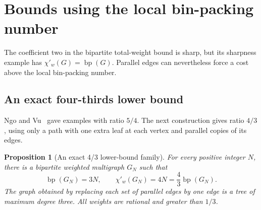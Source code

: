 \documentclass[11pt]{article}
\newtheorem{proposition}[theorem]{Proposition}
\theoremstyle{definition}\newtheorem{algorithm}{Algorithm}[section]
\numberwithin{equation}{section}
\theoremstyle{remark}\newtheorem*{remark}{Remark}
\newcommand{\bp}{\operatorname{bp}}
\begin{document}
\section{Bounds using the local bin-packing number}\label{sec:bp-bounds}
The coefficient two in the bipartite total-weight bound is sharp, but
its sharpness example has $\chi'_w(G)=\bp(G)$. Parallel edges can
nevertheless force a cost above the local bin-packing number.
\subsection{An exact four-thirds lower bound}
Ngo and Vu~\cite{NV} gave examples with ratio $5/4$. The next
construction gives ratio $4/3$, using only a path with one extra leaf
at each vertex and parallel copies of its edges.

\begin{proposition}[An exact 4/3 lower-bound family]\label{prop:lower-four-thirds}
For every positive integer $N$, there is a bipartite weighted multigraph
$G_N$ such that
\[
 \bp(G_N)=3N,\qquad \chi'_w(G_N)=4N=\frac43\bp(G_N).
\]
The graph obtained by replacing each set of parallel edges by one edge
is a tree of maximum degree three. All weights are rational and greater
than $1/3$.
\end{proposition}
\end{document}
